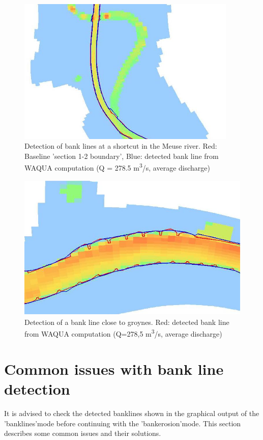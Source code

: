 \begin{figure}[!h]
\includegraphics[width=\textwidth,height=7cm]{figures/Fig3-2.png}
\caption{Detection of bank lines at a shortcut in the Meuse river.
Red: Baseline 'section 1-2 boundary', Blue: detected bank line from WAQUA computation (Q = 278.5 m\textsuperscript{3}/s, average discharge)}
\label{Fig3.2}
\end{figure}

\begin{figure}[!hb]
\includegraphics[width=\textwidth,height=7cm]{figures/Fig3-3.png}
\caption{Detection of a bank line close to groynes.
Red: detected bank line from WAQUA computation (Q=278,5 m\textsuperscript{3}/s, average discharge)}
\label{Fig3.3}
\vspace{-0.75cm} 
\end{figure}
\clearpage

\section{Common issues with bank line detection} \label{Sec:DetectIssues}
It is advised to check the detected banklines shown in the graphical output of the 'banklines'mode before continuing with the 'bankerosion'mode. This section describes some common issues and their solutions.

